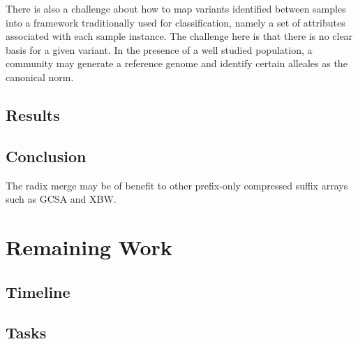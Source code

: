 \documentclass[doctor]{thesis}
\begin{document}
There is also a challenge about how to map variants identified between samples into a framework traditionally used for classification, namely a set of attributes associated with each sample instance.  The challenge here is that there is no clear basis for a given variant.  In the presence of a well studied population, a community may generate a reference genome and identify certain alleales as the canonical norm.
 


\makeatletter{}\section{Results}
 


\makeatletter{}\section{Conclusion}



The radix merge may be of benefit to other prefix-only compressed suffix arrays such as GCSA and XBW.
 

\chapter{Remaining Work}

\section{Timeline}

\section{Tasks}
\end{document}
